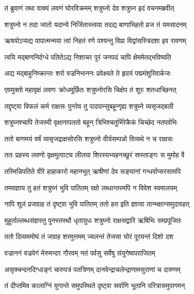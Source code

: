 \twolineshloka
{तं ब्रुवाणं तथा वाक्यं लवणं घोरविक्रमम्}
{शत्रुघ्नो देव शत्रुघ्न इदं वचनमब्रवीत्} %

\twolineshloka
{शत्रुघ्नो न तदा जातो यदान्ये निर्जितास्त्वया}
{तदद्य बाणाभिहतो व्रज तं यमसादनम्} %

\twolineshloka
{ऋषयोऽप्यद्य पापात्मन्मया त्वां निहतं रणे}
{पश्यन्तु विप्रा विद्वांसस्त्रिदशा इव रावणम्} %

\twolineshloka
{त्वयि मद्बाणनिर्दग्धे पतितेऽद्य निशाचर}
{पुरं जनपदं चापि क्षेममेतद्भविष्यति} %

\twolineshloka
{अद्य मद्बाहुनिष्क्रान्तः शरो वज्रनिभाननः}
{प्रवेक्ष्यते ते हृदयं पद्ममंशुरिवार्कजः} %

\twolineshloka
{एवमुक्तो महावृक्षं लवणः क्रोधमूर्छितः}
{शत्रुघ्नोरसि चिक्षेप तं शूरः शतधाच्छिनत्} %

\twolineshloka
{तद्दृष्ट्वा विफलं कर्म राक्षसः पुनरेव तु}
{पादपान्सुबहून्गृह्य शत्रुघ्ने व्यसृजद्बली} %

\twolineshloka
{शत्रुघ्नश्चापि तेजस्वी वृक्षानापततो बहून्}
{त्रिभिश्चतुर्भिरेकैकं चिच्छेद नतपर्वभिः} %

\twolineshloka
{ततो बाणमयं वर्षं व्यसृजद्राक्षसोरसि}
{शत्रुघ्नो वीर्यसम्पन्नो विव्यथे न च राक्षसः} %

\twolineshloka
{ततः प्रहस्य लवणो वृक्षमुत्पाट्य लीलया}
{शिरस्यभ्यहनच्छूरं स्रस्ताङ्गः स मुमोह वै} %

\twolineshloka
{तस्मिन्निपतिते वीरे हाहाकारो महानभूत्}
{ऋषीणां देव सङ्घानां गन्धर्वाप्सरसामपि} %

\twolineshloka
{तमवज्ञाय तु हतं शत्रुघ्नं भुवि पातितम्}
{रक्षो लब्धान्तरमपि न विवेश स्वमालयम्} %

\twolineshloka
{नापि शूलं प्रजग्राह तं दृष्ट्वा भुवि पातितम्}
{ततो हत इति ज्ञात्वा तान्भक्षान्समुदावहत्} %

\twolineshloka
{मुहूर्ताल्लब्धसंज्ञस्तु पुनस्तस्थौ धृतायुधः}
{शत्रुघ्नो राक्षसद्वारि ऋषिभिः सम्प्रपूजितः} %

\twolineshloka
{ततो दिव्यममोघं तं जग्राह शरमुत्तमम्}
{ज्वलन्तं तेजसा घोरं पूरयन्तं दिशो दश} %

\twolineshloka
{वज्राननं वज्रवेगं मेरुमन्दर गौरवम्}
{नतं पर्वसु सर्वेषु संयुगेष्वपराजितम्} %

\twolineshloka
{असृक्चन्दनदिग्धाङ्गं चारुपत्रं पतत्रिणम्}
{दानवेन्द्राचलेन्द्राणामसुराणां च दारुणम्} %

\twolineshloka
{तं दीप्तमिव कालाग्निं युगान्ते समुपस्थिते}
{दृष्ट्वा सर्वाणि भूतानि परित्रासमुपागमन्} %

